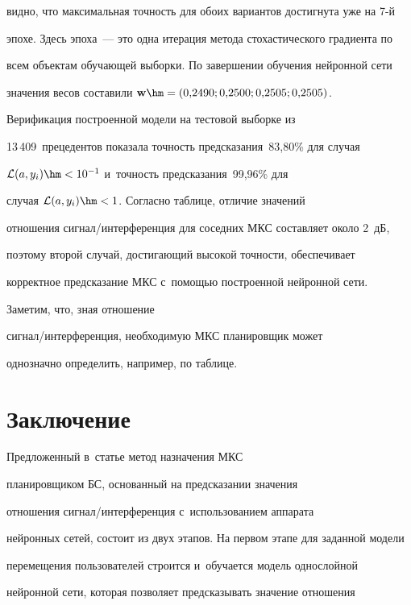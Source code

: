 видно, что максимальная точ\-ность для обоих вариантов достигнута уже на 7-й 


эпохе. Здесь эпоха~--- это одна итерация метода стохастического градиента по 


всем объектам обучающей выборки. По завершении обучения нейронной сети 


значения весов составили $\mathbf{w}\hm= (0{,}2490; 0{,}2500; 0{,}2505; 0{,}2505)$. 


  


  Верификация построенной модели на тестовой выборке из 


13\,409~прецедентов показала точность предсказания~83,80\% для случая 


$\mathcal{L}(a, y_i)\hm< 10^{-1}$ и~точ\-ность предсказания~99,96\% для 


случая $\mathcal{L}(a,y_i)\hm<1$. Согласно таблице, отличие значений 


отношения сигнал/интерференция для соседних МКС составляет около 2~дБ, 


поэтому второй случай, достигающий высокой точности, обеспечивает 


корректное предсказание МКС с~по\-мощью построенной нейронной сети. 


Заметим, что, зная отношение  


сиг\-нал\!/\!ин\-тер\-фе\-рен\-ция, необходимую МКС планировщик может 


однозначно определить, например, по таблице.





\section{Заключение}





  Предложенный в~статье метод назначения МКС


планировщиком БС, основанный на предсказании значения 


отношения сиг\-нал\!/\!ин\-тер\-фе\-рен\-ция с~использованием аппарата 


нейронных сетей, состоит из двух этапов. На первом этапе для заданной модели 


перемещения пользователей строится и~обучается модель однослойной 


нейронной сети, которая позволяет предсказывать значение отношения  


